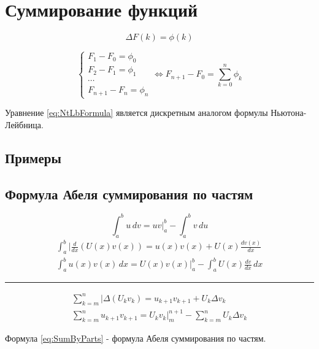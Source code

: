 \documentclass[a4paper,11pt]{article}
\begin{document}
\section{Суммирование функций}
\begin{equation}
  \Delta F(k) = \phi(k)
\end{equation}

\begin{equation}
  \begin{cases}
    F_1 - F_0 = \phi_0 \\
    F_2 - F_1 = \phi_1 \\
    \cdots \\
    F_{n+1} - F_n = \phi_n
  \end{cases} \Leftrightarrow F_{n+1} - F_0 = \sum_{k=0}^{n} \phi_k
  \label{eq:NtLbFormula}
\end{equation}

Уравнение \ref{eq:NtLbFormula} является дискретным аналогом формулы Ньютона-Лейбница.

  \subsection{Примеры}

  \subsection{Формула Абеля суммирования по частям}
  \[\int_{a}^{b} u\,dv = uv \bigg|_{a}^{b} - \int_{a}^{b} v\,du\]
  \begin{equation}
    \begin{split}
      \int_{a}^{b} \bigg| \frac{d}{dx}(U(x)v(x)) = u(x)v(x) + U(x)\frac{dv(x)}{dx} \\
      \int_{a}^{b} u(x)v(x)\,dx = U(x)v(x) \bigg|_{a}^{b} - \int_{a}^{b} U(x)\frac{dv}{dx} \,dx
    \end{split}
  \end{equation}
  \hrule
  \begin{equation}
    \begin{split}
      \sum_{k=m}^{n} \bigg| \Delta(U_k v_k) = u_{k+1} v_{k+1} + U_k \Delta v_k \\
      \sum_{k=m}^{n} u_{k+1} v_{k+1} = U_k v_k \bigg|_{m}^{n+1} - \sum_{k=m}^{n} U_k \Delta v_k
    \end{split}
    \label{eq:SumByParts}
  \end{equation}

  Формула \ref{eq:SumByParts} - формула Абеля суммирования по частям.

\newpage
\end{document}
